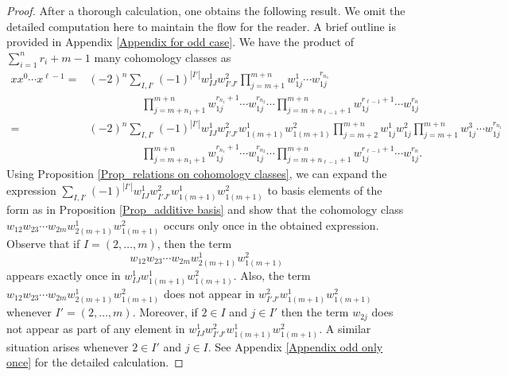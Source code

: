 \documentclass[12pt,oneside,reqno]{amsart}
\theoremstyle{plain}
\theoremstyle{definition}
\theoremstyle{remark}
\begin{document}
\begin{proof}
After a thorough calculation, one obtains the following result. We omit the detailed computation here to maintain the flow for the reader. A brief outline is provided in Appendix \ref{Appendix for odd case}. We have the product of $\sum^{n}_{i=1} {r_i} + m -1$ many cohomology classes as
\begin{align*}
x x^0\cdots x^{\ell-1} = & (-2)^n \sum_{I,I'} (-1)^{|I'|} w^1_{IJ} w^2_{I'J'} \prod^{m+n}_{j=m+1} w^1_{1j}\cdots w^{r_{n_1}}_{1j}\\
&\hspace{2cm} \prod^{m+n}_{j=m+n_1+1} w^{r_{n_1}+1}_{1j} \cdots w^{r_{n_2}}_{1j} \cdots \prod^{m+n}_{j=m+n_{\ell-1}+1} w^{r_{\ell-1}+1}_{1j}\cdots w^{r_n}_{1j}\\
= & (-2)^n \sum_{I,I'} (-1)^{|I'|} w^1_{IJ} w^2_{I'J'} w^1_{1(m+1)} w^2_{1(m+1)} \prod^{m+n}_{j=m+2} w^1_{1j} w^2_{1j} \prod^{m+n}_{j=m+1} w^3_{1j}\cdots w^{r_{n_1}}_{1j}\\
&\hspace{2cm} \prod^{m+n}_{j=m+n_1+1} w^{r_{n_1}+1}_{1j} \cdots w^{r_{n_2}}_{1j} \cdots \prod^{m+n}_{j=m+n_{\ell-1}+1} w^{r_{\ell-1}+1}_{1j}\cdots w^{r_n}_{1j}.
\end{align*}
Using Proposition \ref{Prop_relations on cohomology classes}, we can expand the expression $\displaystyle\sum_{I,I'} (-1)^{|I'|} w^1_{IJ} w^2_{I'J'} w^1_{1(m+1)} w^2_{1(m+1)}$ to basis elements of the form as in Proposition \ref{Prop_additive basis} and show that the cohomology class $w_{12} w_{23}\cdots w_{2m} w^1_{2(m+1)} w^2_{1(m+1)}$ occurs only once in the obtained expression.
Observe that if $I = (2,\ldots,m)$, then the term $$w_{12} w_{23}\cdots w_{2m} w^1_{2(m+1)} w^2_{1(m+1)}$$ appears exactly once in $w^1_{IJ} w^1_{1(m+1)} w^2_{1(m+1)}$. Also, the term $w_{12} w_{23}\cdots w_{2m} w^1_{2(m+1)} w^2_{1(m+1)}$ does not appear in $w^2_{I'J'} w^1_{1(m+1)} w^2_{1(m+1)}$ whenever $I' = (2,\ldots,m)$. 
Moreover, if $2\in I$ and $j\in I'$ then the term $w_{2j}$ does not appear as part of any element in $w^1_{IJ} w^2_{I'J'} w^1_{1(m+1)} w^2_{1(m+1)}$. A similar situation arises whenever $2\in I'$ and $j\in I$. See Appendix \ref{Appendix odd only once} for the detailed calculation.


\end{proof}
\end{document}
